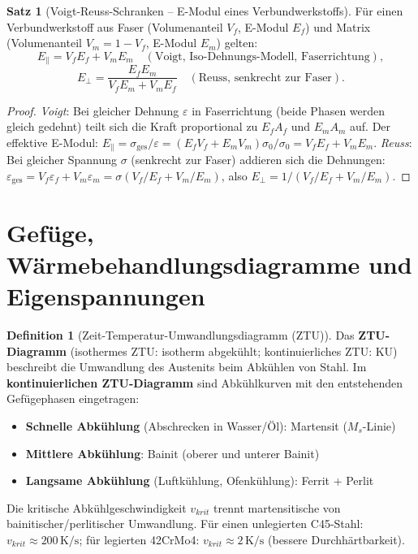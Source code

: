 ﻿\documentclass[a4paper,12pt]{report}
\theoremstyle{definition}
\newtheorem{definition}{Definition}
\newtheorem{satz}{Satz}
\begin{document}
\begin{satz}[Voigt-Reuss-Schranken -- E-Modul eines Verbundwerkstoffs]
F\"ur einen Verbundwerkstoff aus Faser (Volumenanteil $V_f$, E-Modul $E_f$)
und Matrix (Volumenanteil $V_m = 1-V_f$, E-Modul $E_m$) gelten:
\[
  E_{\|} = V_f E_f + V_m E_m \quad (\text{Voigt, Iso-Dehnungs-Modell, Faserrichtung}),
\]
\[
  E_{\perp} = \frac{E_f E_m}{V_f E_m + V_m E_f} \quad (\text{Reuss, senkrecht zur Faser}).
\]
\end{satz}
\begin{proof}
\textit{Voigt}: Bei gleicher Dehnung $\varepsilon$ in Faserrichtung
(beide Phasen werden gleich gedehnt) teilt sich die Kraft proportional
zu $E_f A_f$ und $E_m A_m$ auf. Der effektive E-Modul:
$E_{\|} = \sigma_{\text{ges}}/\varepsilon = (E_f V_f + E_m V_m)\sigma_0/\sigma_0 = V_f E_f + V_m E_m$.
\textit{Reuss}: Bei gleicher Spannung $\sigma$ (senkrecht zur Faser)
addieren sich die Dehnungen: $\varepsilon_{\text{ges}} = V_f\varepsilon_f + V_m\varepsilon_m
= \sigma(V_f/E_f + V_m/E_m)$, also $E_{\perp} = 1/(V_f/E_f + V_m/E_m)$.
\end{proof}


\section{Gefüge, Wärmebehandlungsdiagramme und Eigenspannungen}

\begin{definition}[Zeit-Temperatur-Umwandlungsdiagramm (ZTU)]
Das \textbf{ZTU-Diagramm} (isothermes ZTU: isotherm abgekühlt; kontinuierliches ZTU: KU)
beschreibt die Umwandlung des Austenits beim Abkühlen von Stahl.
Im \textbf{kontinuierlichen ZTU-Diagramm} sind Abkühlkurven mit
den entstehenden Gefügephasen eingetragen:
\begin{itemize}
    \item[-] \textbf{Schnelle Abkühlung} (Abschrecken in Wasser/Öl): Martensit ($M_s$-Linie)
    \item[-] \textbf{Mittlere Abkühlung}: Bainit (oberer und unterer Bainit)
    \item[-] \textbf{Langsame Abkühlung} (Luftkühlung, Ofenkühlung): Ferrit + Perlit
\end{itemize}
Die kritische Abkühlgeschwindigkeit $v_{krit}$ trennt martensitische
von bainitischer/perlitischer Umwandlung. Für einen unlegierten C45-Stahl:
$v_{krit} \approx 200\,\mathrm{K/s}$; für legierten 42CrMo4:
$v_{krit} \approx 2\,\mathrm{K/s}$ (bessere Durchhärtbarkeit).
\end{definition}
\end{document}
